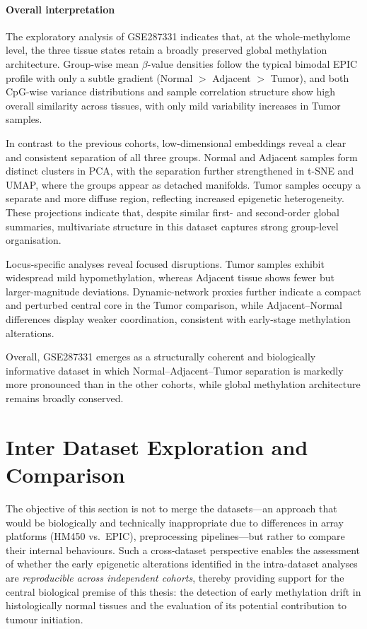 \paragraph{Overall interpretation}

The exploratory analysis of GSE287331 indicates that, at the whole-methylome level,
the three tissue states retain a broadly preserved global methylation architecture. Group-wise mean $\beta$-value densities follow the typical bimodal EPIC profile
with only a subtle gradient (Normal $>$ Adjacent $>$ Tumor),
and both CpG-wise variance distributions and sample correlation structure
show high overall similarity across tissues, with only mild variability increases in Tumor samples.

In contrast to the previous cohorts, low-dimensional embeddings reveal
a clear and consistent separation of all three groups. Normal and Adjacent samples form distinct clusters in PCA,
with the separation further strengthened in t-SNE and UMAP,
where the groups appear as detached manifolds. Tumor samples occupy a separate and more diffuse region,
reflecting increased epigenetic heterogeneity. These projections indicate that, despite similar first- and second-order
global summaries, multivariate structure in this dataset
captures strong group-level organisation.

Locus-specific analyses reveal focused disruptions. Tumor samples exhibit widespread mild hypomethylation,
whereas Adjacent tissue shows fewer but larger-magnitude deviations.
Dynamic-network proxies further indicate a compact and perturbed
central core in the Tumor comparison,
while Adjacent–Normal differences display weaker coordination,
consistent with early-stage methylation alterations.

Overall, GSE287331 emerges as a structurally coherent and biologically
informative dataset in which Normal–Adjacent–Tumor separation
is markedly more pronounced than in the other cohorts,
while global methylation architecture remains broadly conserved.


\section{Inter Dataset Exploration and Comparison}
\label{sec:inter_dataset}

The objective of this section is not to merge the datasets—an approach that would be biologically and technically inappropriate due to differences in array platforms (HM450 vs.\ EPIC), preprocessing pipelines—but rather to compare their internal behaviours. Such a cross-dataset perspective enables the assessment of whether the early epigenetic alterations identified in the intra-dataset analyses are \emph{reproducible across independent cohorts}, thereby providing support for the central biological premise of this thesis: the detection of early methylation drift in histologically normal tissues and the evaluation of its potential contribution to tumour initiation.

